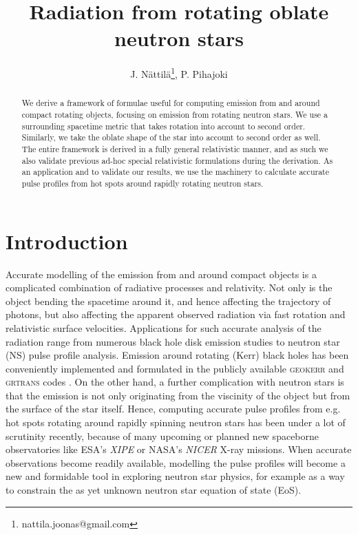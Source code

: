 \documentclass[iop, usenatbib]{emulateapj}
\begin{document}
\title{Radiation from rotating oblate neutron stars}

\author{J. Nättilä\thanks{nattila.joonas@gmail.com},
  P. Pihajoki}

\affil{}


\begin{abstract}
We derive a framework of formulae useful for computing emission from and
around compact rotating objects, focusing on emission from rotating
neutron stars. We use a surrounding spacetime metric that takes rotation
into account to second order.  Similarly, we take the oblate shape of
the star into account to second order as well. The entire framework is
derived in a fully general relativistic manner, and as such we also
validate previous ad-hoc special relativistic formulations during the
derivation.  As an application and to validate our results, we use the
machinery to calculate accurate pulse profiles from hot spots around
rapidly rotating neutron stars.
\end{abstract}

\section{Introduction}
Accurate modelling of the emission from and around compact objects is a
complicated combination of radiative processes and relativity.  Not only
is the object bending the spacetime around it, and hence affecting the
trajectory of photons, but also affecting the apparent observed
radiation via fast rotation and relativistic surface velocities.
Applications for such accurate analysis of the radiation range from
numerous black hole disk emission studies to neutron star (NS) pulse
profile analysis.  Emission around rotating (Kerr) black holes has been
conveniently implemented and formulated in the publicly available \textsc{geokerr} and
\textsc{grtrans} codes \citep{dexter2009,dexter2016}.
On the other hand, a further complication with neutron stars is that the
emission is not only originating from the viscinity of the object but
from the surface of the star itself.  Hence, computing accurate pulse
profiles from e.g. hot spots rotating around rapidly spinning neutron
stars has been under a lot of scrutinity recently, because of many
upcoming or planned new spaceborne observatories like ESA's
\textit{XIPE} or NASA's \textit{NICER} X-ray missions.
When accurate observations become readily available,
modelling the pulse profiles will become a new and formidable tool in
exploring neutron star physics, for example as a way to constrain the as yet unknown neutron star  
equation of state (EoS).
\end{document}
